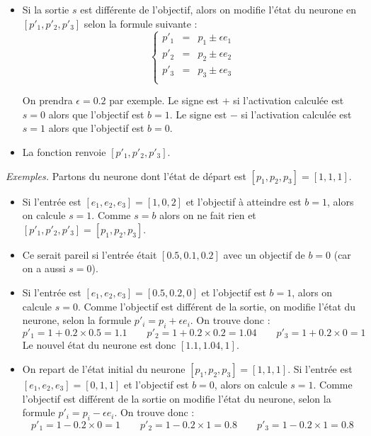 \documentclass[10pt,class=report,crop=false]{standalone}
\begin{document}
\begin{activite}[Neurone]
\begin{enumerate}
\begin{itemize}
		\item Si la sortie $s$ est différente de l'objectif, alors on modifie l'état du neurone en $[p'_1,p'_2,p'_3]$ selon la formule suivante :
		$$\left\{ 
		\begin{array}{rcl}
		p'_1 &=& p_1 \pm \epsilon e_1 \\
		p'_2 &=& p_2 \pm \epsilon e_2 \\
		p'_3 &=& p_3 \pm \epsilon e_3 \\
		\end{array}
		\right.$$		

		On prendra $\epsilon = 0.2$ par exemple.
		Le signe est \og{}$+$\fg{} si l'activation calculée est $s=0$ alors que l'objectif est $b=1$.
		Le signe est \og{}$-$\fg{} si l'activation calculée est $s=1$ alors que l'objectif est $b=0$.
		
		\item La fonction renvoie $[p'_1,p'_2,p'_3]$.
	\end{itemize}			
		
	\medskip
	
	\emph{Exemples.}
	Partons du neurone dont l'état de départ  est $[p_1,p_2,p_3] = [1,1,1]$.
	\begin{itemize}
		\item Si l'entrée est $[e_1,e_2,e_3] = [1,0,2]$ et l'objectif à atteindre est $b=1$, alors on calcule $s=1$.
		Comme $s=b$ alors on ne fait rien et $[p'_1,p'_2,p'_3] = [p_1,p_2,p_3]$.
		
		\item Ce serait pareil si l'entrée était $[0.5,0.1,0.2]$ avec un objectif de $b=0$ (car on a aussi $s=0$).
		
		\item Si l'entrée est $[e_1,e_2,e_3] = [0.5,0.2,0]$ et l'objectif est $b=1$, alors on calcule $s=0$.
		Comme l'objectif est différent de la sortie, on modifie l'état du neurone, selon la formule 
		$p'_i = p_i + \epsilon e_i$. On trouve donc :
	$$p'_1 = 1 + 0.2 \times 0.5 = 1.1 \qquad p'_2 = 1 + 0.2 \times 0.2 = 1.04 \qquad p'_3 = 1 + 0.2 \times 0 = 1$$
		Le nouvel état du neurone est donc $[1.1,1.04,1]$.

		
		\item On repart de l'état initial du neurone $[p_1,p_2,p_3] = [1,1,1]$.
		Si l'entrée est $[e_1,e_2,e_3] = [0,1,1]$ et l'objectif est $b=0$, alors on calcule $s=1$.
		Comme l'objectif est différent de la sortie on modifie l'état du neurone, selon la formule 
		$p'_i = p_i - \epsilon e_i$. On trouve donc :
		$$p'_1 = 1 - 0.2 \times 0 = 1 \qquad p'_2 = 1 - 0.2 \times 1 = 0.8 \qquad p'_3 = 1 - 0.2 \times 1 = 0.8$$
		

\end{itemize}
\end{enumerate}
\end{activite}
\end{document}
